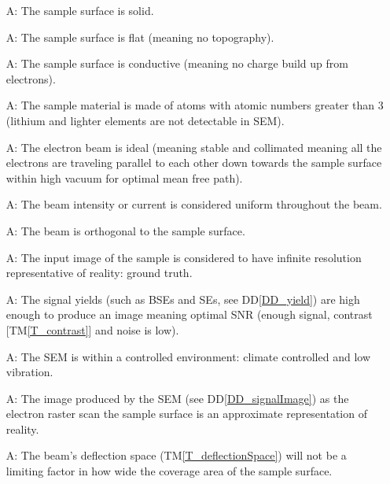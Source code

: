 \documentclass[12pt]{article}
\newcommand{\ddref}[1]{DD\ref{#1}}
\newcommand{\tref}[1]{TM\ref{#1}}
\newcounter{assumpnum} %
\begin{document}
\begin{itemize}

\item[A\refstepcounter{assumpnum}\theassumpnum \label{A_sampleSolid}:] The sample 
surface is solid.

\item[A\refstepcounter{assumpnum}\theassumpnum \label{A_sampleTopo}:] The sample 
surface is flat (meaning no topography).

\item[A\refstepcounter{assumpnum}\theassumpnum \label{A_sampleConductive}:] The sample 
surface is conductive (meaning no charge build up from electrons).

\item[A\refstepcounter{assumpnum}\theassumpnum \label{A_sampleZ}:] The sample 
material is made of atoms with atomic numbers greater than 3 (lithium and lighter elements are not detectable in SEM).

\item[A\refstepcounter{assumpnum}\theassumpnum \label{A_beam}:] The electron 
beam is ideal (meaning stable and collimated meaning all the electrons are 
traveling parallel to each other down towards the sample surface within high 
vacuum for optimal mean free path).

\item[A\refstepcounter{assumpnum}\theassumpnum \label{A_beam1}:] The beam 
intensity or current is considered uniform throughout the beam.

\item[A\refstepcounter{assumpnum}\theassumpnum \label{A_beam2}:] The beam is orthogonal to the sample surface.

\item[A\refstepcounter{assumpnum}\theassumpnum \label{A_inputImage}:] The input 
image of the sample is considered to have infinite resolution representative of reality: ground truth.

\item[A\refstepcounter{assumpnum}\theassumpnum \label{A_yield}:] The signal yields (such as BSEs and SEs, see \ddref{DD_yield})
are high enough to produce an image meaning optimal SNR (enough signal, 
contrast [\tref{T_contrast}] and noise is low).

\item[A\refstepcounter{assumpnum}\theassumpnum \label{A_environment}:] The SEM 
is within a controlled environment: climate controlled and low vibration.

\item[A\refstepcounter{assumpnum}\theassumpnum \label{A_reality}:] The image 
produced by the SEM (see \ddref{DD_signalImage}) as the electron raster scan the sample surface is an 
approximate representation of reality.

\item[A\refstepcounter{assumpnum}\theassumpnum \label{A_deflectionLimit}:] The beam's deflection 
space (\tref{T_deflectionSpace}) will not be a limiting factor in how wide the coverage area 
of the sample surface.

\end{itemize}
\end{document}
